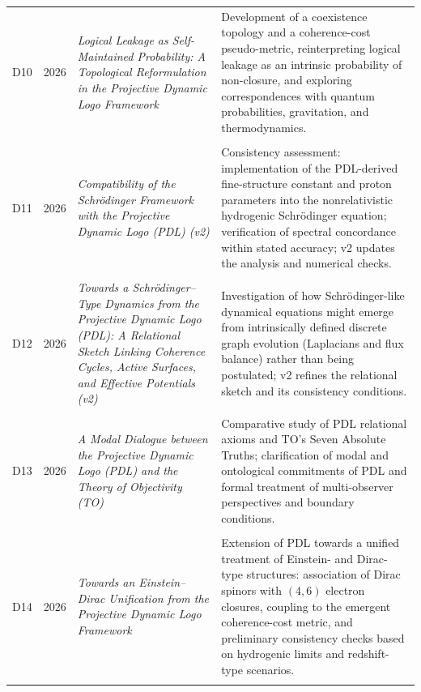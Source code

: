 \documentclass[11pt,a4paper]{article}
\begin{document}
\begin{longtable}{@{}llL{4cm}p{9.0cm}@{}}
D10 & 2026 & \textit{Logical Leakage as Self-Maintained Probability: A Topological Reformulation in the Projective Dynamic Logo Framework} &
Development of a coexistence topology and a coherence-cost pseudo-metric, reinterpreting logical leakage as an intrinsic probability of non-closure, and exploring correspondences with quantum probabilities, gravitation, and thermodynamics. \citep{Topological_Reformulation_PDL_2026} \\\\[0.5em]

D11 & 2026 & \textit{Compatibility of the Schr\"odinger Framework with the Projective Dynamic Logo (PDL) (v2)} &
Consistency assessment: implementation of the PDL-derived fine-structure constant and proton parameters into the nonrelativistic hydrogenic Schr\"odinger equation; verification of spectral concordance within stated accuracy; v2 updates the analysis and numerical checks. \citep{Schrodinger_PDL_v2_2026} \\\\[0.5em]

D12 & 2026 & \textit{Towards a Schr\"odinger--Type Dynamics from the Projective Dynamic Logo (PDL): A Relational Sketch Linking Coherence Cycles, Active Surfaces, and Effective Potentials (v2)} &
Investigation of how Schr\"odinger-like dynamical equations might emerge from intrinsically defined discrete graph evolution (Laplacians and flux balance) rather than being postulated; v2 refines the relational sketch and its consistency conditions. \citep{Schrodinger_Sketch_v2_2026} \\\\[0.5em]

D13 & 2026 & \textit{A Modal Dialogue between the Projective Dynamic Logo (PDL) and the Theory of Objectivity (TO)} &
Comparative study of PDL relational axioms and TO's Seven Absolute Truths; clarification of modal and ontological commitments of PDL and formal treatment of multi-observer perspectives and boundary conditions. \citep{PDL_TO_dialogue} \\\\[0.5em]

D14 & 2026 & \textit{Towards an Einstein--Dirac Unification from the Projective Dynamic Logo Framework} &
Extension of PDL towards a unified treatment of Einstein- and Dirac-type structures: association of Dirac spinors with $(4,6)$ electron closures, coupling to the emergent coherence-cost metric, and preliminary consistency checks based on hydrogenic limits and redshift-type scenarios. \citep{Einstein_Dirac_PDL_2026} \\\\[0.5em]


\end{longtable}
\end{document}
